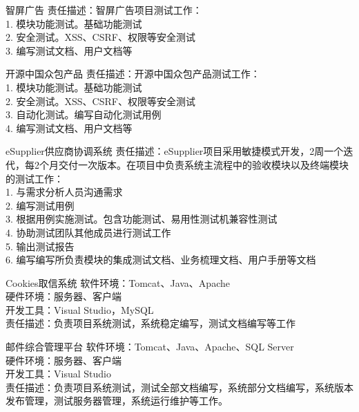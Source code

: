 \documentclass[11pt,a4paper]{moderncv}
\begin{document}
{智屏广告}{}{}{}
{责任描述：智屏广告项目测试工作：\\
1. 模块功能测试。基础功能测试\\
2. 安全测试。XSS、CSRF、权限等安全测试\\
3. 编写测试文档、用户文档等
}

{开源中国众包产品}{}{}{}
{责任描述：开源中国众包产品测试工作：\\
1. 模块功能测试。基础功能测试\\
2. 安全测试。XSS、CSRF、权限等安全测试\\
3. 自动化测试。编写自动化测试用例\\
4. 编写测试文档、用户文档等
}

{eSupplier供应商协调系统}{}{}{}
{责任描述：eSupplier项目采用敏捷模式开发，2周一个迭代，每2个月交付一次版本。在项目中负责系统主流程中的验收模块以及终端模块的测试工作：\\
1. 与需求分析人员沟通需求\\
2. 编写测试用例\\
3. 根据用例实施测试。包含功能测试、易用性测试机兼容性测试\\
4. 协助测试团队其他成员进行测试工作\\
5. 输出测试报告\\
6. 编写编写所负责模块的集成测试文档、业务梳理文档、用户手册等文档
}


{Cookies取信系统}
{}
{}{}
{软件环境：Tomcat、Java、Apache\\
硬件环境：服务器、客户端\\
开发工具：Visual Studio，MySQL\\
责任描述：负责项目系统测试，系统稳定编写，测试文档编写等工作
}

{邮件综合管理平台}
{}
{}{}
{软件环境：Tomcat、Java、Apache、SQL Server\\
硬件环境：服务器、客户端\\
开发工具：Visual Studio\\
责任描述：负责项目系统测试，测试全部文档编写，系统部分文档编写，系统版本发布管理，测试服务器管理，系统运行维护等工作。
}
\end{document}
